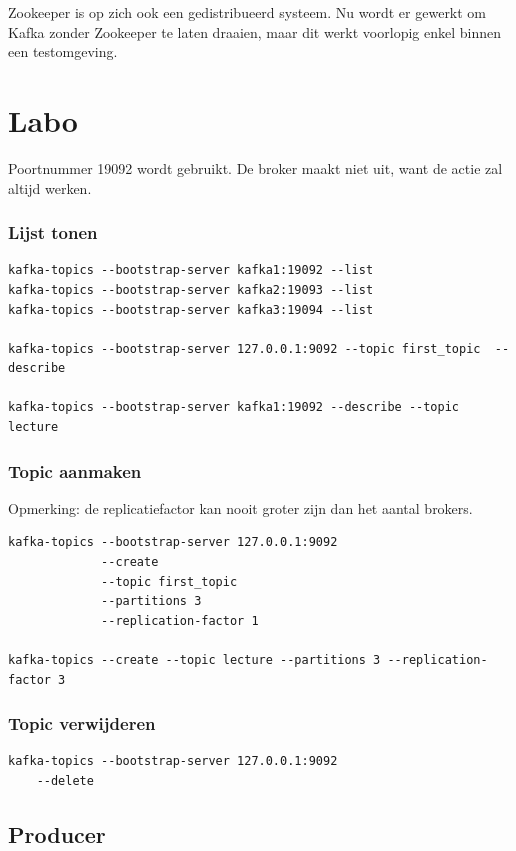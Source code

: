 \documentclass[a4paper,10pt,twoside]{report}
\begin{document}
Zookeeper is op zich ook een gedistribueerd systeem. Nu wordt er gewerkt om Kafka zonder Zookeeper te laten draaien, maar dit werkt voorlopig enkel binnen een testomgeving.

\section{Labo}

Poortnummer 19092 wordt gebruikt. De broker maakt niet uit, want de actie zal altijd werken.

\subsubsection{Lijst tonen}

\begin{lstlisting}[language=CLI-kafka]
kafka-topics --bootstrap-server kafka1:19092 --list
kafka-topics --bootstrap-server kafka2:19093 --list
kafka-topics --bootstrap-server kafka3:19094 --list

kafka-topics --bootstrap-server 127.0.0.1:9092 --topic first_topic  --describe

kafka-topics --bootstrap-server kafka1:19092 --describe --topic lecture
\end{lstlisting}

\subsubsection{Topic aanmaken}
Opmerking: de replicatiefactor kan nooit groter zijn dan het aantal brokers.
\begin{lstlisting}[language=CLI-kafka]
kafka-topics --bootstrap-server 127.0.0.1:9092
			 --create
			 --topic first_topic
			 --partitions 3
			 --replication-factor 1
			 
kafka-topics --create --topic lecture --partitions 3 --replication-factor 3
\end{lstlisting}


\subsubsection{Topic verwijderen}

\begin{lstlisting}[language=CLI-kafka]
kafka-topics --bootstrap-server 127.0.0.1:9092
	--delete
\end{lstlisting}


\subsection{Producer}
\end{document}
